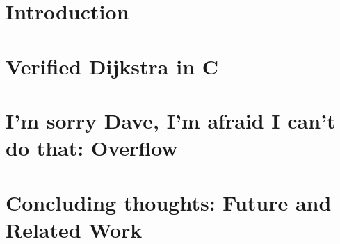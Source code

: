 \documentclass[runningheads]{llncs}
\begin{document}



\section{Introduction}
\label{sec:intro}


\section{Verified Dijkstra in C}
\label{sec:overview}


\section{I'm sorry Dave, I'm afraid I can't do that: Overflow}
\label{sec:overflow}



\section{Concluding thoughts: Future and Related Work}
\label{sec:conclusion}





\appendix
\label{sec:apx}

% 


\end{document}
